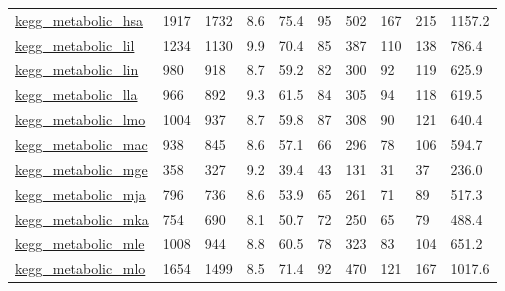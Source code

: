 \begin{longtable}{llllllllll}
 \href{http://santafe.edu/~aaronc/data/kegg2006_metabolic.zip}{kegg\_metabolic\_hsa}                                          & 1917       & 1732  & 8.6    & 75.4   & 95    & 502    & 167    & 215    & 1157.2  \\
 \href{http://santafe.edu/~aaronc/data/kegg2006_metabolic.zip}{kegg\_metabolic\_lil}                                          & 1234       & 1130  & 9.9    & 70.4   & 85    & 387    & 110    & 138    & 786.4   \\
 \href{http://santafe.edu/~aaronc/data/kegg2006_metabolic.zip}{kegg\_metabolic\_lin}                                          & 980        & 918   & 8.7    & 59.2   & 82    & 300    & 92     & 119    & 625.9   \\
 \href{http://santafe.edu/~aaronc/data/kegg2006_metabolic.zip}{kegg\_metabolic\_lla}                                          & 966        & 892   & 9.3    & 61.5   & 84    & 305    & 94     & 118    & 619.5   \\
 \href{http://santafe.edu/~aaronc/data/kegg2006_metabolic.zip}{kegg\_metabolic\_lmo}                                          & 1004       & 937   & 8.7    & 59.8   & 87    & 308    & 90     & 121    & 640.4   \\
 \href{http://santafe.edu/~aaronc/data/kegg2006_metabolic.zip}{kegg\_metabolic\_mac}                                          & 938        & 845   & 8.6    & 57.1   & 66    & 296    & 78     & 106    & 594.7   \\
 \href{http://santafe.edu/~aaronc/data/kegg2006_metabolic.zip}{kegg\_metabolic\_mge}                                          & 358        & 327   & 9.2    & 39.4   & 43    & 131    & 31     & 37     & 236.0   \\
 \href{http://santafe.edu/~aaronc/data/kegg2006_metabolic.zip}{kegg\_metabolic\_mja}                                          & 796        & 736   & 8.6    & 53.9   & 65    & 261    & 71     & 89     & 517.3   \\
 \href{http://santafe.edu/~aaronc/data/kegg2006_metabolic.zip}{kegg\_metabolic\_mka}                                          & 754        & 690   & 8.1    & 50.7   & 72    & 250    & 65     & 79     & 488.4   \\
 \href{http://santafe.edu/~aaronc/data/kegg2006_metabolic.zip}{kegg\_metabolic\_mle}                                          & 1008       & 944   & 8.8    & 60.5   & 78    & 323    & 83     & 104    & 651.2   \\
 \href{http://santafe.edu/~aaronc/data/kegg2006_metabolic.zip}{kegg\_metabolic\_mlo}                                          & 1654       & 1499  & 8.5    & 71.4   & 92    & 470    & 121    & 167    & 1017.6  \\

\end{longtable}
